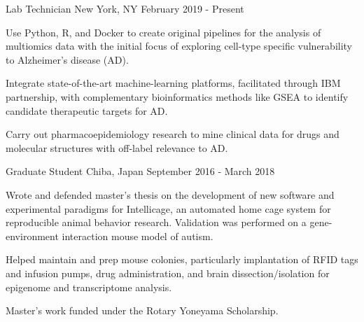 %
%
%

\vspace*{0.35cm}

\begin{cventries}

    {Lab Technician}
    {New York, NY}
    {February 2019 - Present}
    {\begin{cvitems}
        \item{Use Python, R, and Docker to create original pipelines for the analysis of multiomics data with the initial focus of exploring cell-type specific vulnerability to Alzheimer's disease (AD).\vspace*{0.1cm}}
        \item{Integrate state-of-the-art machine-learning platforms, facilitated through IBM partnership, with complementary bioinformatics methods like GSEA to identify candidate therapeutic targets for AD.\vspace*{0.1cm}}
        \item{Carry out pharmacoepidemiology research to mine clinical data for drugs and molecular structures with off-label relevance to AD.}
    \end{cvitems}}
    \vspace*{0.2cm}

    {Graduate Student}
    {Chiba, Japan}
    {September 2016 - March 2018}
    {\begin{cvitems}
        \item{Wrote and defended master's thesis on the development of new software and experimental paradigms for Intellicage, an automated home cage system for reproducible animal behavior research. Validation was performed on a gene-environment interaction mouse model of autism.\vspace*{0.1cm}}
        \item{Helped maintain and prep mouse colonies, particularly implantation of RFID tags and infusion pumps, drug administration, and brain dissection/isolation for epigenome and transcriptome analysis.\vspace*{0.1cm}}
        \item{Master's work funded under the Rotary Yoneyama Scholarship.}
    \end{cvitems}}
    \vspace*{0.2cm}
    

\end{cventries}
